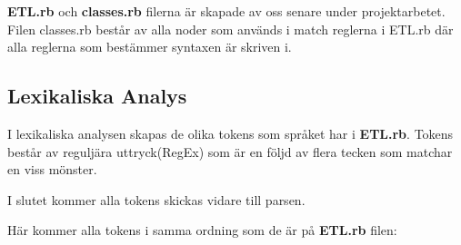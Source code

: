 \documentclass{TDP019mall}
\begin{document}
\textbf{ETL.rb} och \textbf{classes.rb} filerna är skapade av oss senare under projektarbetet. Filen classes.rb består av alla noder 
som används i match reglerna i ETL.rb där alla reglerna som bestämmer syntaxen är skriven i.  

\subsection{Lexikaliska Analys}
I lexikaliska analysen skapas de olika tokens som språket har i \textbf{ETL.rb}. Tokens består av reguljära uttryck(RegEx) som är en följd av 
flera tecken som matchar en viss mönster. 

I slutet kommer alla tokens skickas vidare till parsen. 

Här kommer alla tokens i samma ordning som de är på \textbf{ETL.rb} filen:
\end{document}
